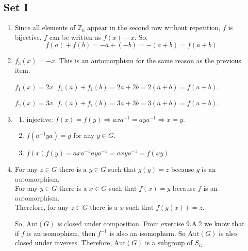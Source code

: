 \documentclass{article}
\begin{document}
\subsection{Set I}
\begin{enumerate}
    \item Since all elements of $ \mathbb{Z}_6 $ appear in the second row without repetition, $ f $ is bijective. $ f $ can be written as $ f(x) -x $. So,
    $$
        f(a) + f(b) = -a + (-b) = -(a + b) = f(a + b)
    $$

    \item $ f_3(x) = -x $. This is an automorphism for the same reason as the previous item.

    $ f_1(x) = 2x $. $ f_1(a) + f_1(b) = 2a + 2b = 2(a + b) = f(a + b) $.

    $ f_2(x) = 3x $. $ f_1(a) + f_1(b) = 3a + 3b = 3(a + b) = f(a + b) $.

    \item
        \begin{enumerate}
            \item injective: $ f(x) = f(y) \Rightarrow axa^{-1} = aya^{-1} \Rightarrow x = y $.

            \item $ f(a^{-1}ya) = y$ for any $ y \in G $.

            \item $ f(x)f(y) = axa^{-1}aya^{-1} = axya^{-1} = f(xy) $.
        \end{enumerate}

    \item
        For any $ z \in G $ there is a $ y \in G $ such that $ g(y) = z $ because $ g $ is an automorphism.\\
        For any $ y \in G $ there is a $ x \in G $ such that $ f(x) = y $ because $ f$ is an automorphism.\\
        Therefore, for any $ z \in G $ there is a $ x $ such that $ f(g(x)) = z $.

        So, $ \text{Aut}(G) $ is closed under composition. From exercise 9.A.2 we know that if $ f $ is an isomophism, then $ f^{-1} $ is also an isomophism. So $\text{Aut}(G)$ is also closed under inverses. Therefore, $\text{Aut}(G)$ is a subgroup of $ S_G $.
\end{enumerate}
\end{document}
